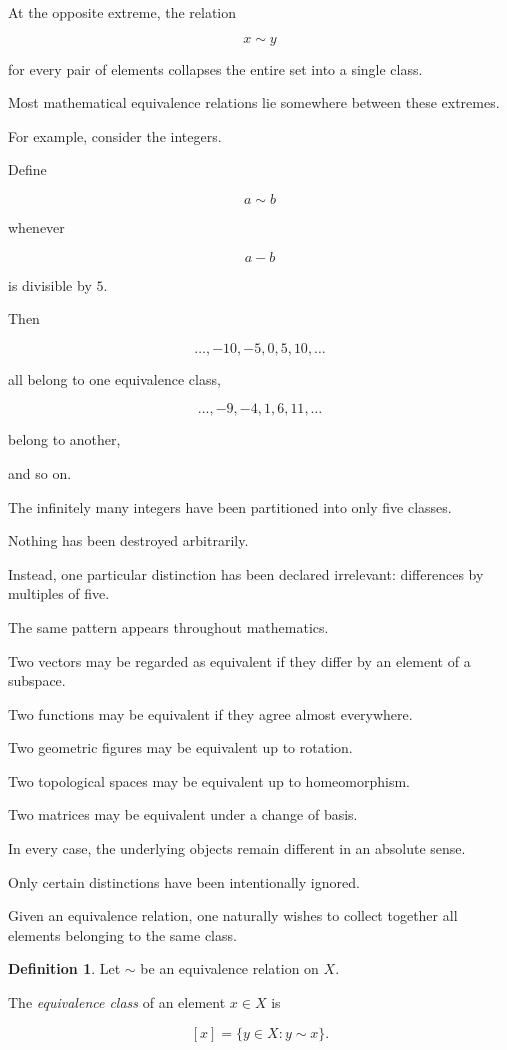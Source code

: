 \documentclass[11pt]{book}
\numberwithin{equation}{chapter}
\theoremstyle{definition}
\newtheorem{definition}{Definition}[chapter]
\theoremstyle{plain}
\theoremstyle{remark}
\begin{document}
At the opposite extreme, the relation

\[
x\sim y
\]

for every pair of elements collapses the entire set into a single class.

Most mathematical equivalence relations lie somewhere between these extremes.

For example, consider the integers.

Define

\[
a\sim b
\]

whenever

\[
a-b
\]

is divisible by \(5\).

Then

\[
\ldots,-10,-5,0,5,10,\ldots
\]

all belong to one equivalence class,

\[
\ldots,-9,-4,1,6,11,\ldots
\]

belong to another,

and so on.

The infinitely many integers have been partitioned into only five classes.

Nothing has been destroyed arbitrarily.

Instead, one particular distinction has been declared irrelevant: differences by multiples of five.

The same pattern appears throughout mathematics.

Two vectors may be regarded as equivalent if they differ by an element of a subspace.

Two functions may be equivalent if they agree almost everywhere.

Two geometric figures may be equivalent up to rotation.

Two topological spaces may be equivalent up to homeomorphism.

Two matrices may be equivalent under a change of basis.

In every case, the underlying objects remain different in an absolute sense.

Only certain distinctions have been intentionally ignored.

Given an equivalence relation, one naturally wishes to collect together all elements belonging to the same class.

\begin{definition}
Let \(\sim\) be an equivalence relation on \(X\).

The \emph{equivalence class} of an element \(x\in X\) is

\[
[x]
=
\{y\in X:y\sim x\}.
\]
\end{definition}
\end{document}
